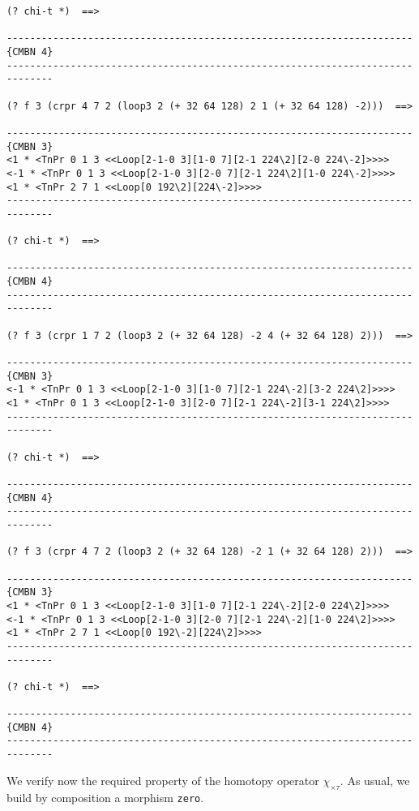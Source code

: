 {\begin{verbatim}
(? chi-t *)  ==>

----------------------------------------------------------------------{CMBN 4}
------------------------------------------------------------------------------

(? f 3 (crpr 4 7 2 (loop3 2 (+ 32 64 128) 2 1 (+ 32 64 128) -2)))  ==>

----------------------------------------------------------------------{CMBN 3}
<1 * <TnPr 0 1 3 <<Loop[2-1-0 3][1-0 7][2-1 224\2][2-0 224\-2]>>>>
<-1 * <TnPr 0 1 3 <<Loop[2-1-0 3][2-0 7][2-1 224\2][1-0 224\-2]>>>>
<1 * <TnPr 2 7 1 <<Loop[0 192\2][224\-2]>>>>
------------------------------------------------------------------------------

(? chi-t *)  ==>

----------------------------------------------------------------------{CMBN 4}
------------------------------------------------------------------------------

(? f 3 (crpr 1 7 2 (loop3 2 (+ 32 64 128) -2 4 (+ 32 64 128) 2)))  ==>

----------------------------------------------------------------------{CMBN 3}
<-1 * <TnPr 0 1 3 <<Loop[2-1-0 3][1-0 7][2-1 224\-2][3-2 224\2]>>>>
<1 * <TnPr 0 1 3 <<Loop[2-1-0 3][2-0 7][2-1 224\-2][3-1 224\2]>>>>
------------------------------------------------------------------------------

(? chi-t *)  ==>

----------------------------------------------------------------------{CMBN 4}
------------------------------------------------------------------------------

(? f 3 (crpr 4 7 2 (loop3 2 (+ 32 64 128) -2 1 (+ 32 64 128) 2)))  ==>

----------------------------------------------------------------------{CMBN 3}
<1 * <TnPr 0 1 3 <<Loop[2-1-0 3][1-0 7][2-1 224\-2][2-0 224\2]>>>>
<-1 * <TnPr 0 1 3 <<Loop[2-1-0 3][2-0 7][2-1 224\-2][1-0 224\2]>>>>
<1 * <TnPr 2 7 1 <<Loop[0 192\-2][224\2]>>>>
------------------------------------------------------------------------------

(? chi-t *)  ==>

----------------------------------------------------------------------{CMBN 4}
------------------------------------------------------------------------------
\end{verbatim}}
We verify now
the required property of the homotopy operator $\chi_{\times\tau}$. As usual, we build
by composition a morphism {\tt zero}.
